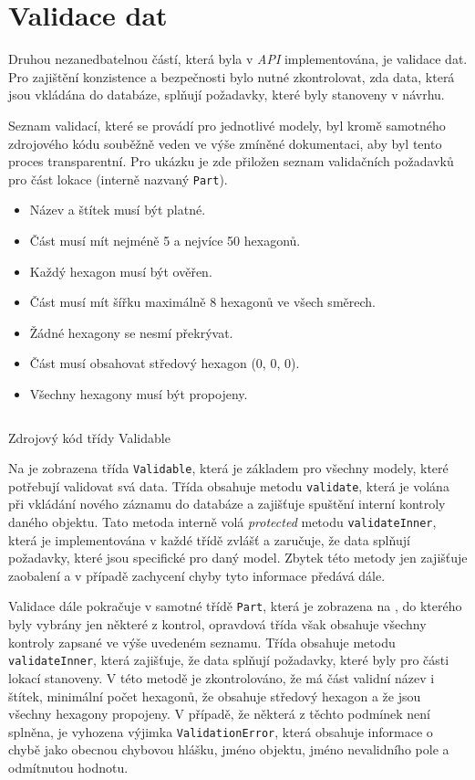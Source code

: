 \section{Validace dat}
\label{sec:validation}

Druhou nezanedbatelnou částí, která byla v \textit{API} implementována, je validace dat. Pro zajištění konzistence a bezpečnosti bylo nutné zkontrolovat, zda data, která jsou vkládána do databáze, splňují požadavky, které byly stanoveny v návrhu.

Seznam validací, které se provádí pro jednotlivé modely, byl kromě samotného zdrojového kódu souběžně veden ve výše zmíněné dokumentaci, aby byl tento proces transparentní. Pro ukázku je zde přiložen seznam validačních požadavků pro část lokace (interně nazvaný \texttt{Part}).

\begin{itemize}
    \setlength\itemsep{0.5mm}
    \item Název a štítek musí být platné.
    \item Část musí mít nejméně 5 a nejvíce 50 hexagonů.
    \item Každý hexagon musí být ověřen.
    \item Část musí mít šířku maximálně 8 hexagonů ve všech směrech.
    \item Žádné hexagony se nesmí překrývat.
    \item Část musí obsahovat středový hexagon (0, 0, 0).
    \item Všechny hexagony musí být propojeny.
\end{itemize}

\begin{listing}[h]
    \inputminted{Java}{code/Validable.java}
    \caption{Zdrojový kód třídy Validable}
    \label{code:validable}
\end{listing}

Na  je zobrazena třída \texttt{Validable}, která je základem pro všechny modely, které potřebují validovat svá data. Třída obsahuje metodu \texttt{validate}, která je volána při vkládání nového záznamu do databáze a zajišťuje spuštění interní kontroly daného objektu. Tato metoda interně volá \textit{protected} metodu \texttt{validateInner}, která je implementována v každé třídě zvlášť a zaručuje, že data splňují požadavky, které jsou specifické pro daný model. Zbytek této metody jen zajišťuje zaobalení a v případě zachycení chyby tyto informace předává dále.

Validace dále pokračuje v samotné třídě \texttt{Part}, která je zobrazena na , do kterého byly vybrány jen některé z kontrol, opravdová třída však obsahuje všechny kontroly zapsané ve výše uvedeném seznamu. Třída obsahuje metodu \texttt{validateInner}, která zajišťuje, že data splňují požadavky, které byly pro části lokací stanoveny. V této metodě je zkontrolováno, že má část validní název i štítek, minimální počet hexagonů, že obsahuje středový hexagon a že jsou všechny hexagony propojeny. V případě, že některá z těchto podmínek není splněna, je vyhozena výjimka \texttt{ValidationError}, která obsahuje informace o chybě jako obecnou chybovou hlášku, jméno objektu, jméno nevalidního pole a odmítnutou hodnotu.

